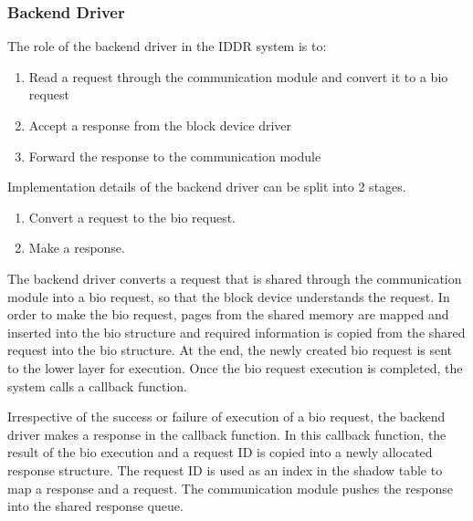 \subsubsection*{Backend Driver}
The role of the backend driver in the IDDR system is to:
\begin{enumerate}
\item Read a request through the communication module and convert it to a bio request
\item Accept a response from the block device driver
\item Forward the response to the communication module
\end{enumerate}

Implementation details of the backend driver can be split into 2 stages. 
\begin{enumerate}
\item Convert a request to the bio request. 
\item Make a response.
\end{enumerate}

\label{subsec:createbio}
The backend driver converts a request that is shared through the communication module into a bio request, so that the block device understands the request. In order to make the bio request, pages from the shared memory are mapped and inserted into the bio structure and required information is copied from the shared request into the bio structure. At the end, the newly created bio request is sent to the lower layer for execution. Once the bio request execution is completed, the system calls a callback function.

Irrespective of the success or failure of execution of a bio request, the backend driver makes a response in the callback function. In this callback function, the result of the bio execution and a request ID is copied into a newly allocated response structure. The request ID is used as an index in the shadow table to map a response and a request. The communication module pushes the response into the shared response queue.

% 
